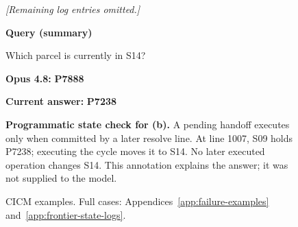 \begin{figure}[b]
\begin{minipage}[t]{0.49\linewidth}
\begin{tcolorbox}[cicmexample,title={(b) Tracking a deferred handoff}]
\textcolor{neutralink}{\emph{[Remaining log entries omitted.]}}\par\medskip
\textbf{Query (summary)}\par
Which parcel is currently in S14?\par\medskip
\textbf{Opus 4.8:} \textcolor{staleink}{\textbf{P7888}}\par
\textbf{Current answer:} \textcolor{currentink}{\textbf{P7238}}
\end{tcolorbox}
\end{minipage}
\par\vspace{2mm}
\begin{tcolorbox}[enhanced,breakable=false,colback=currentfill,colframe=currentink,
boxrule=0.5pt,arc=1mm,left=2mm,right=2mm,top=1mm,bottom=1mm,
fontupper=\footnotesize,before skip=0pt,after skip=0pt]
\textbf{Programmatic state check for (b).} A pending handoff executes only when
committed by a later resolve line. At line 1007, S09 holds P7238; executing
the cycle moves it to S14. No later executed operation changes S14.
This annotation explains the answer; it was not supplied to the model.
\end{tcolorbox}
\endgroup
\caption{CICM examples.
Full cases: Appendices~\ref{app:failure-examples} and~\ref{app:frontier-state-logs}.}
\label{fig:cicm-examples}
\end{figure}
